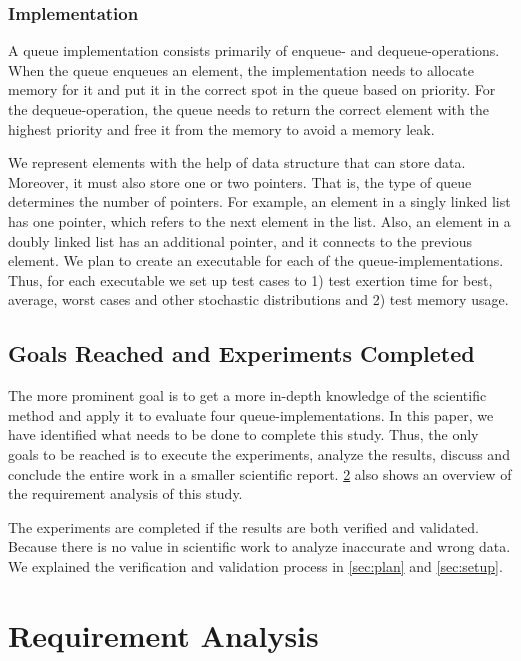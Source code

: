 \documentclass[a4paper,11pt]{kth-mag}
\newcommand*{\skippara}{\par\vspace{\baselineskip} \noindent}
\begin{document}
\subsection{Implementation}
A queue implementation consists primarily of enqueue- and dequeue-operations.
When the queue enqueues an element, the implementation needs to allocate memory for it and put it in the correct spot in the queue based on priority.
For the dequeue-operation, the queue needs to return the correct element with the highest priority and free it from the memory to avoid a memory leak.

\skippara We represent elements with the help of data structure that can store data.
Moreover, it must also store one or two pointers.
That is, the type of queue determines the number of pointers.
For example, an element in a singly linked list has one pointer, which refers to the next element in the list.
Also, an element in a doubly linked list has an additional pointer, and it connects to the previous element.
We plan to create an executable for each of the queue-implementations.
Thus, for each executable we set up test cases to 1) test exertion time for best, average, worst cases and other stochastic distributions and 2) test memory usage.

\skippara

\section{Goals Reached and Experiments Completed}\label{sec:goal}
The more prominent goal is to get a more in-depth knowledge of the scientific method and apply it to evaluate four queue-implementations.
In this paper, we have identified what needs to be done to complete this study.
Thus, the only goals to be reached is to execute the experiments, analyze the results, discuss and conclude the entire work in a smaller scientific report.
\cref{app:A} also shows an overview of the requirement analysis of this study.

\skippara The experiments are completed if the results are both verified and validated. Because there is no value in scientific work to analyze inaccurate and wrong data. We explained the verification and validation process in \cref{sec:plan} and \cref{sec:setup}.


\appendix
\addappheadtotoc
\chapter{Requirement Analysis}\label{app:A}
\end{document}

